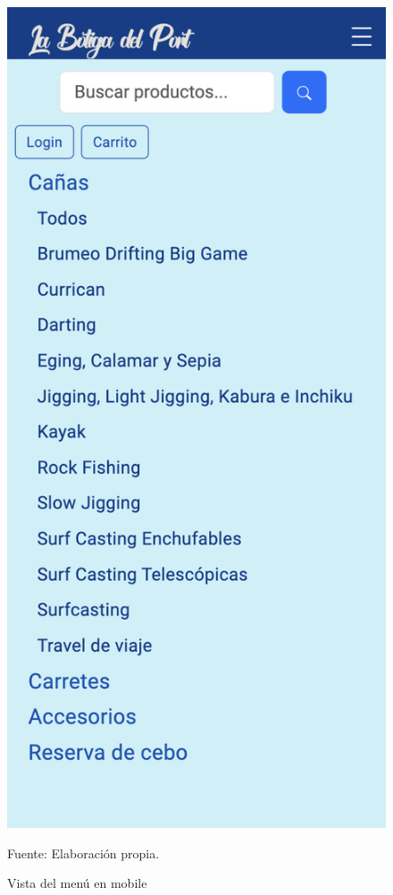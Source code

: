\begin{figure}[H]
\begin{center}
\includegraphics[scale=0.35]{./Images/vistaMobileOpen.png}
\caption{Vista del menú en mobile} Fuente: Elaboración propia.

\label{fig:fig2}

\end{center}
\end{figure}

